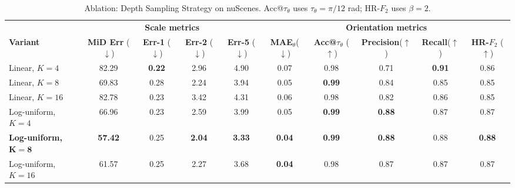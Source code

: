 \documentclass[journal]{IEEEtran}
\begin{document}
\begin{table}[t]
\centering
\caption{Ablation: Depth Sampling Strategy on nuScenes. Acc@\(\tau_\theta\) uses \(\tau_\theta=\pi/12\) rad; HR-\(F_2\) uses \(\beta=2\).}
\label{tab:ablation_depth}
\setlength{\tabcolsep}{4pt}
\footnotesize
\begin{adjustbox}{width=\textwidth,center}
\begin{tabular}{@{}l cccc ccccc@{}}
\toprule
& \multicolumn{4}{c}{\textbf{Scale metrics}} & \multicolumn{5}{c}{\textbf{Orientation metrics}} \\
\cmidrule(lr){2-5} \cmidrule(lr){6-10}
\textbf{Variant} 
& \textbf{MiD Err} (\(\downarrow\)) & \textbf{Err-1} (\(\downarrow\)) & \textbf{Err-2} (\(\downarrow\)) & \textbf{Err-5} (\(\downarrow\))
& \textbf{MAE\(_\theta\)}(\(\downarrow\)) & \textbf{Acc@\(\tau_\theta\)} (\(\uparrow\)) & \textbf{Precision}(\(\uparrow\)) & \textbf{Recall}(\(\uparrow\)) & \textbf{HR-\(F_2\)} (\(\uparrow\)) \\
\midrule
Linear, \(K=4\)        & 82.29 & \textbf{0.22} & 2.96 & 4.90 & 0.07 & 0.98 & 0.71 & \textbf{0.91} & 0.86 \\
Linear, \(K=8\)        & 69.83 & 0.28 & 2.24 & 3.94 & 0.05 & \textbf{0.99} & 0.84 & 0.85 & 0.85 \\
Linear, \(K=16\)       & 82.78 & 0.23 & 3.42 & 4.31 & 0.06 & 0.98 & 0.82 & 0.86 & 0.85 \\
Log-uniform, \(K=4\)   & 66.96 & 0.23 & 2.59 & 3.99 & 0.05 & \textbf{0.99} & \textbf{0.88} & 0.87 & 0.87 \\
\textbf{Log-uniform, \(\mathbf{K{=}8}\)}
    & \textbf{57.42} & 0.25 & \textbf{2.04} & \textbf{3.33} & \textbf{0.04} & \textbf{0.99} & \textbf{0.88} & 0.88 & \textbf{0.88} \\
Log-uniform, \(K=16\)  & 61.57 & 0.25 & 2.27 & 3.68 & \textbf{0.04} & 0.98 & 0.87 & 0.87 & 0.87 \\
\bottomrule
\end{tabular}
\end{adjustbox}
\end{table}
\end{document}
